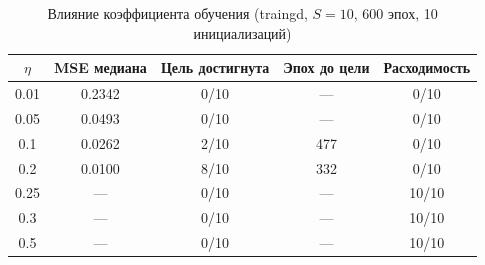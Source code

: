 \begin{table}[H]
\caption{Влияние коэффициента обучения (traingd, $S=10$, 600 эпох, 10 инициализаций)}
\label{tab:lr}
\centering
\small
\begin{tabular}{ccccc}
\toprule
$\eta$ & MSE медиана & Цель достигнута & Эпох до цели & Расходимость \\
\midrule
0.01 & 0.2342 & 0/10 & — & 0/10 \\
0.05 & 0.0493 & 0/10 & — & 0/10 \\
0.1 & 0.0262 & 2/10 & 477 & 0/10 \\
0.2 & 0.0100 & 8/10 & 332 & 0/10 \\
0.25 & --- & 0/10 & — & 10/10 \\
0.3 & --- & 0/10 & — & 10/10 \\
0.5 & --- & 0/10 & — & 10/10 \\
\bottomrule
\end{tabular}
\end{table}
